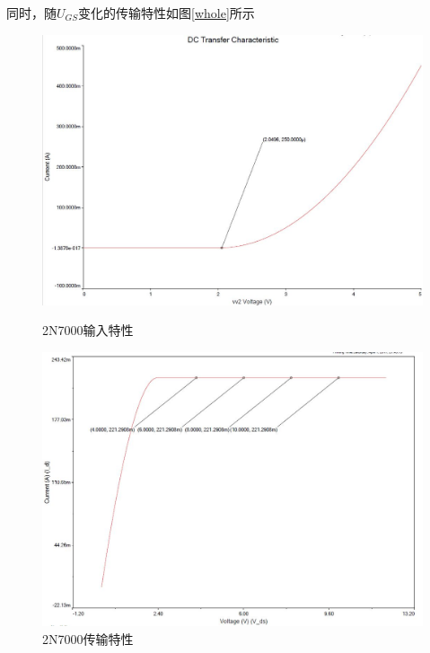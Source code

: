 \documentclass[UTF8,a4paper]{ctexart}
\begin{document}
同时，随$U_{GS}$变化的传输特性如图\ref{whole}所示
\begin{figure}
\centering
\includegraphics[width=\textwidth]{2-1in.jpg}
\caption{2N7000输入特性}
\label{in}
\includegraphics[width=\textwidth]{2-1out.jpg}
\caption{2N7000传输特性}
\label{transfer} 
\end{figure}
\end{document}
